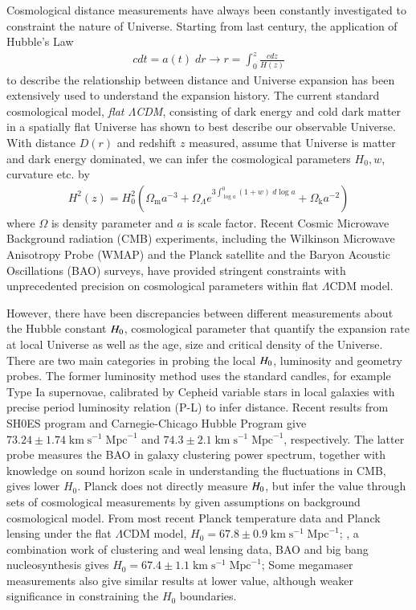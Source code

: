 \documentclass{cosmo}
\begin{document}
    Cosmological distance measurements have always been constantly investigated to constraint the nature of Universe. Starting from last century, the application of Hubble's Law 
    \begin{align*}
        c dt = a(t) \;dr \longrightarrow
    r = \int_0^z \frac{c dz}{H(z)}
    \end{align*}to describe the relationship between distance and Universe expansion has been extensively used to understand the expansion history. The current standard cosmological model, \emph{flat $\Lambda$CDM}, consisting of dark energy and cold dark matter in a spatially flat Universe has shown to best describe our observable Universe. With distance $D(r)$ and redshift $z$ measured, assume that Universe is matter and dark energy dominated, we can infer the cosmological parameters $H_\mathrm{0}, w$, curvature etc. by 
    \begin{align*}
        H^2 (z) = H_0^2 \left(\Omega_\mathrm{m} a^{-3}+\Omega_{\Lambda} e^{3 \int_{\log{a}}^0 (1+w)\;d\log{a}}+\Omega_\mathrm{k}a^{-2}\right)
    \end{align*}
    where $\Omega$ is density parameter and $a$ is scale factor. Recent Cosmic Microwave Background radiation (CMB) experiments, including the Wilkinson Microwave Anisotropy Probe (WMAP) and the Planck satellite and the Baryon Acoustic Oscillations (BAO) surveys, have provided stringent constraints with unprecedented precision on cosmological parameters within flat $\Lambda$CDM model.
    
    However, there have been discrepancies between different measurements about the Hubble constant $H_{\rm{0}}$, cosmological parameter that quantify the expansion rate at local Universe as well as the age, size and critical density of the Universe. 
    There are two main categories in probing the local $H_{\rm{0}}$, luminosity and geometry probes. 
    The former luminosity method uses the standard candles, for example Type Ia supernovae, calibrated by Cepheid variable stars in local galaxies with precise period luminosity relation (P-L) to infer distance. Recent results from SH0ES program \citep{Riess2016} and Carnegie-Chicago Hubble Program \citep{Beaton2016} give $73.24 \pm 1.74 \;\mathrm{km\; s^{-1} \; {Mpc}^{-1}}$ and  $74.3 \pm 2.1 \;\mathrm{km\; s^{-1} \; {Mpc}^{-1}}$, respectively. 
    The latter probe measures the BAO in galaxy clustering power spectrum, together with knowledge on sound horizon scale in understanding the fluctuations in CMB, gives lower $H_\mathrm{0}$. Planck does not directly measure $H_{\rm{0}}$, but infer the value through sets of cosmological measurements by given assumptions on background cosmological model. From most recent Planck temperature data and Planck lensing under the flat $\Lambda$CDM model, $H_\mathrm{0}=67.8 \pm 0.9 \;\mathrm{km\; s^{-1} \; {Mpc}^{-1}}$; \cite{Abbott2018}, a combination work of clustering and weal lensing data, BAO and big bang nucleosynthesis gives $H_\mathrm{0}=67.4 \pm 1.1 \;\mathrm{km\; s^{-1} \; {Mpc}^{-1}}$; Some megamaser measurements also give similar results at lower value, although weaker significance in constraining the $H_\mathrm{0}$ boundaries.
    
\end{document}
